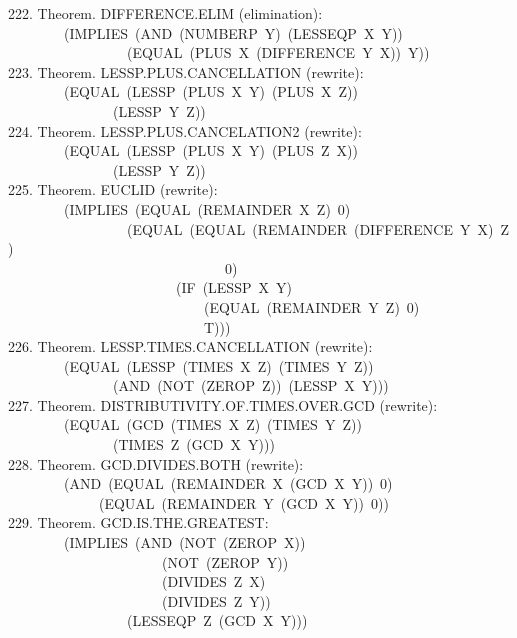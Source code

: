 \documentclass[10pt]{book}
\newenvironment{pubasis}{\begin{flushleft}}{\end{flushleft}}
\begin{document}
\begin{pubasis}
222.    Theorem.  DIFFERENCE.ELIM (elimination):\\
~~~~~~~~(IMPLIES~(AND~(NUMBERP~Y)~(LESSEQP~X~Y))\\
~~~~~~~~~~~~~~~~~(EQUAL~(PLUS~X~(DIFFERENCE~Y~X))~Y))\\

223.    Theorem.  LESSP.PLUS.CANCELLATION (rewrite):\\
~~~~~~~~(EQUAL~(LESSP~(PLUS~X~Y)~(PLUS~X~Z))\\
~~~~~~~~~~~~~~~(LESSP~Y~Z))\\

224.    Theorem.  LESSP.PLUS.CANCELATION2 (rewrite):\\
~~~~~~~~(EQUAL~(LESSP~(PLUS~X~Y)~(PLUS~Z~X))\\
~~~~~~~~~~~~~~~(LESSP~Y~Z))\\

225.    Theorem.  EUCLID (rewrite):\\
~~~~~~~~(IMPLIES~(EQUAL~(REMAINDER~X~Z)~0)\\
~~~~~~~~~~~~~~~~~(EQUAL~(EQUAL~(REMAINDER~(DIFFERENCE~Y~X)~Z)\\
~~~~~~~~~~~~~~~~~~~~~~~~~~~~~~~0)\\
~~~~~~~~~~~~~~~~~~~~~~~~(IF~(LESSP~X~Y)\\
~~~~~~~~~~~~~~~~~~~~~~~~~~~~(EQUAL~(REMAINDER~Y~Z)~0)\\
~~~~~~~~~~~~~~~~~~~~~~~~~~~~T)))\\

226.    Theorem.  LESSP.TIMES.CANCELLATION (rewrite):\\
~~~~~~~~(EQUAL~(LESSP~(TIMES~X~Z)~(TIMES~Y~Z))\\
~~~~~~~~~~~~~~~(AND~(NOT~(ZEROP~Z))~(LESSP~X~Y)))\\

227.    Theorem.  DISTRIBUTIVITY.OF.TIMES.OVER.GCD (rewrite):\\
~~~~~~~~(EQUAL~(GCD~(TIMES~X~Z)~(TIMES~Y~Z))\\
~~~~~~~~~~~~~~~(TIMES~Z~(GCD~X~Y)))\\

228.    Theorem.  GCD.DIVIDES.BOTH (rewrite):\\
~~~~~~~~(AND~(EQUAL~(REMAINDER~X~(GCD~X~Y))~0)\\
~~~~~~~~~~~~~(EQUAL~(REMAINDER~Y~(GCD~X~Y))~0))\\

229.    Theorem.  GCD.IS.THE.GREATEST:\\
~~~~~~~~(IMPLIES~(AND~(NOT~(ZEROP~X))\\
~~~~~~~~~~~~~~~~~~~~~~(NOT~(ZEROP~Y))\\
~~~~~~~~~~~~~~~~~~~~~~(DIVIDES~Z~X)\\
~~~~~~~~~~~~~~~~~~~~~~(DIVIDES~Z~Y))\\
~~~~~~~~~~~~~~~~~(LESSEQP~Z~(GCD~X~Y)))\\


\end{pubasis}
\end{document}
